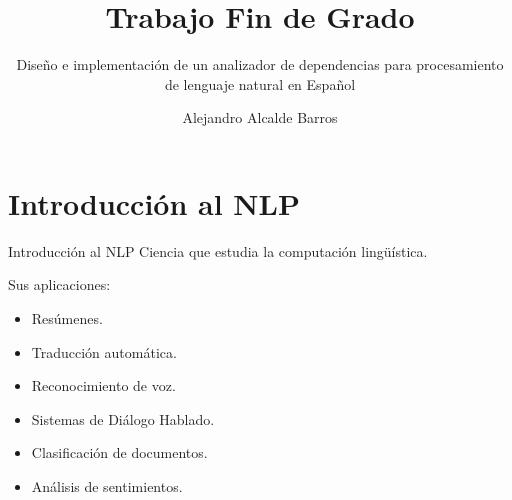 \documentclass{beamer}
\title{Trabajo Fin de Grado} %
\subtitle{Diseño e implementación de un analizador de dependencias para procesamiento de lenguaje natural en Español} %
\author{Alejandro Alcalde Barros}
\begin{document}
\frame{\maketitle}

  \section{Introducción al NLP}
  \label{sec:intro}
  \begin{frame}[label=intro]{Introducción al NLP}
    Ciencia que estudia la computación lingüística.

    Sus aplicaciones:
    \begin{itemize}
    \item Resúmenes.
    \item Traducción automática.
    \item Reconocimiento de voz.
    \item Sistemas de Diálogo Hablado.
    \item Clasificación de documentos.
    \item Análisis de sentimientos.
    \end{itemize}
  \end{frame}

  \newcommand*{\checktikz}[1][]{\tikz[x=1em, y=1em]\fill[#1] (0,.35) -- (.25,0) --
      (1,.7) -- (.25,.15) -- cycle;}
  \newcommand*{\ccheck}{\checktikz[tick,rounded corners=.5pt, draw=tick,
      thin]} %
\end{document}
